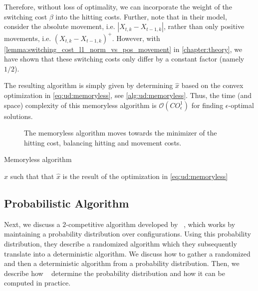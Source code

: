Therefore, without loss of optimality, we can incorporate the weight of the switching cost $\beta$ into the hitting costs. Further, note that in their model, \citeauthor{Bansal2015}~\cite{Bansal2015} consider the absolute movement, i.e. $|X_{t,k} - X_{t-1,k}|$, rather than only positive movements, i.e. $(X_{t,k} - X_{t-1,k})^+$. However, with \cref{lemma:switching_cost_l1_norm_vs_pos_movement} in \cref{chapter:theory}, we have shown that these switching costs only differ by a constant factor (namely $1/2$).

The resulting algorithm is simply given by determining $\hat{x}$ based on the convex optimization in \cref{eq:ud:memoryless}, see \cref{alg:ud:memoryless}. Thus, the time (and space) complexity of this memoryless algorithm is $\mathcal{O}(C O_{\epsilon}^1)$ for finding $\epsilon$-optimal solutions.

\begin{figure}
    \centering
    
    \caption{The memoryless algorithm moves towards the minimizer of the hitting cost, balancing hitting and movement costs.}
    \label{fig:memoryless_algorithm}
\end{figure}

\begin{algorithm}
    \caption{Memoryless algorithm~\cite{Bansal2015}}\label{alg:ud:memoryless}
    \Return $\hat{x}$ such that that $\hat{x}$ is the result of the optimization in \cref{eq:ud:memoryless}\;
\end{algorithm}

\subsection{Probabilistic Algorithm}\label{section:online_algorithms:ud:probabilistic}

Next, we discuss a $2$-competitive algorithm developed by \citeauthor{Bansal2015}~\cite{Bansal2015}, which works by maintaining a probability distribution over configurations. Using this probability distribution, they describe a randomized algorithm which they subsequently translate into a deterministic algorithm. We discuss how to gather a randomized and then a deterministic algorithm from a probability distribution. Then, we describe how \citeauthor{Bansal2015}~\cite{Bansal2015} determine the probability distribution and how it can be computed in practice.

